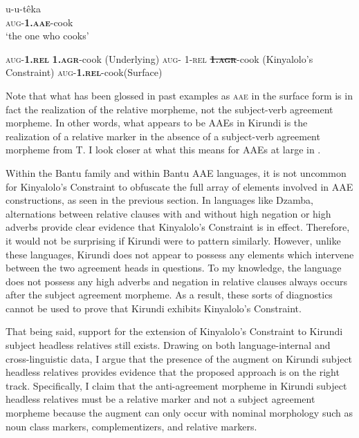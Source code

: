 \documentclass[output=paper,colorlinks,citecolor=brown
]{langscibook}
\begin{document}
\ea \gll u-u-têka\\
\textsc{aug}-{\bfseries  \textsc{1.aae}}-cook \\
\glt `the one who cooks' \label{ex:myers:deriv}

\begin{xlist}
    \ex \textsc{aug}-{\bfseries  1.\textsc{rel}} {\bfseries  \textsc{1.agr}}-cook \hfill{(Underlying)}
\ex \textsc{aug}- 1-\textsc{rel} \sout{{\bfseries  \textsc{1.agr}}}-cook  \hfill{(Kinyalolo's Constraint)}
\ex \textsc{aug}-{\bfseries  \textsc{1.rel}}-cook\hfill{(Surface)}
 \end{xlist}
 \z

\noindent Note that what has been glossed in past examples as \textsc{aae} in the surface form is in fact the realization of the relative morpheme, not the subject-verb agreement morpheme. In other words, what appears to be AAEs in Kirundi is the realization of a relative marker in the absence of a subject-verb agreement morpheme from T. I look closer at what this means for AAEs at large in .

 Within the Bantu family and within Bantu AAE languages, it is not uncommon for Kinyalolo's Constraint to obfuscate the full array of elements involved in AAE constructions, as seen in the previous section. In languages like Dzamba, alternations between relative clauses with and without high negation or high adverbs provide clear evidence that Kinyalolo's Constraint is in effect. Therefore, it would not be surprising if Kirundi were to pattern similarly. However, unlike these languages, Kirundi does not appear to possess any elements which intervene between the two agreement heads in questions. To my knowledge, the language does not possess any high adverbs and negation in relative clauses always occurs after the subject agreement morpheme. As a result, these sorts of diagnostics cannot be used to prove that Kirundi exhibits Kinyalolo's Constraint.

 That being said, support for the extension of Kinyalolo's Constraint to Kirundi subject headless relatives still exists. Drawing on both language-internal and cross-linguistic data, I argue that the presence of the augment on Kirundi subject headless relatives provides evidence that the proposed approach is on the right track. Specifically, I claim that the anti-agreement morpheme in Kirundi subject headless relatives must be a relative marker and not a subject agreement morpheme because the augment can only occur with nominal morphology such as noun class markers, complementizers, and relative markers.
\end{document}
